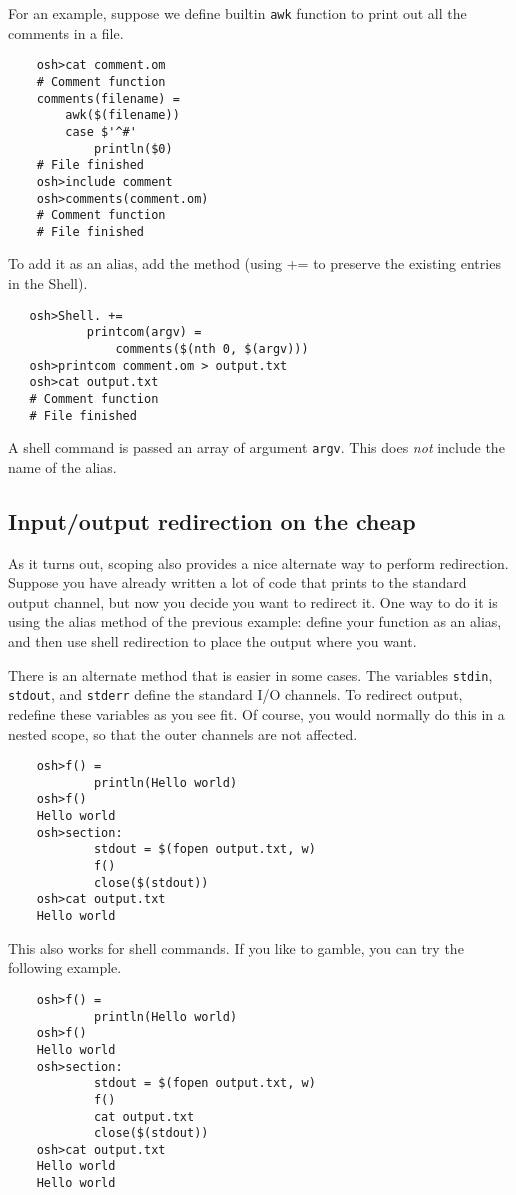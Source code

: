 For an example, suppose we define builtin \verb+awk+ function to print out all the comments in a file.

\begin{verbatim}
    osh>cat comment.om
    # Comment function
    comments(filename) =
        awk($(filename))
        case $'^#'
            println($0)
    # File finished
    osh>include comment
    osh>comments(comment.om)
    # Comment function
    # File finished
\end{verbatim}

To add it as an alias, add the method (using += to preserve the existing entries in the Shell).

\begin{verbatim}
   osh>Shell. +=
           printcom(argv) =
               comments($(nth 0, $(argv)))
   osh>printcom comment.om > output.txt
   osh>cat output.txt
   # Comment function
   # File finished
\end{verbatim}

A shell command is passed an array of argument \verb+argv+.  This does \emph{not} include the name
of the alias.

\subsection{Input/output redirection on the cheap}

As it turns out, scoping also provides a nice alternate way to perform redirection.  Suppose you
have already written a lot of code that prints to the standard output channel, but now you decide
you want to redirect it.  One way to do it is using the alias method of the previous example: define
your function as an alias, and then use shell redirection to place the output where you want.

There is an alternate method that is easier in some cases.  The variables \verb+stdin+,
\verb+stdout+, and \verb+stderr+ define the standard I/O channels.  To redirect output, redefine
these variables as you see fit.  Of course, you would normally do this in a nested scope, so that
the outer channels are not affected.

\begin{verbatim}
    osh>f() =
            println(Hello world)
    osh>f()
    Hello world
    osh>section:
            stdout = $(fopen output.txt, w)
            f()
            close($(stdout))
    osh>cat output.txt
    Hello world
\end{verbatim}

This also works for shell commands.  If you like to gamble, you can try the following example.

\begin{verbatim}
    osh>f() =
            println(Hello world)
    osh>f()
    Hello world
    osh>section:
            stdout = $(fopen output.txt, w)
            f()
            cat output.txt
            close($(stdout))
    osh>cat output.txt
    Hello world
    Hello world
\end{verbatim}

